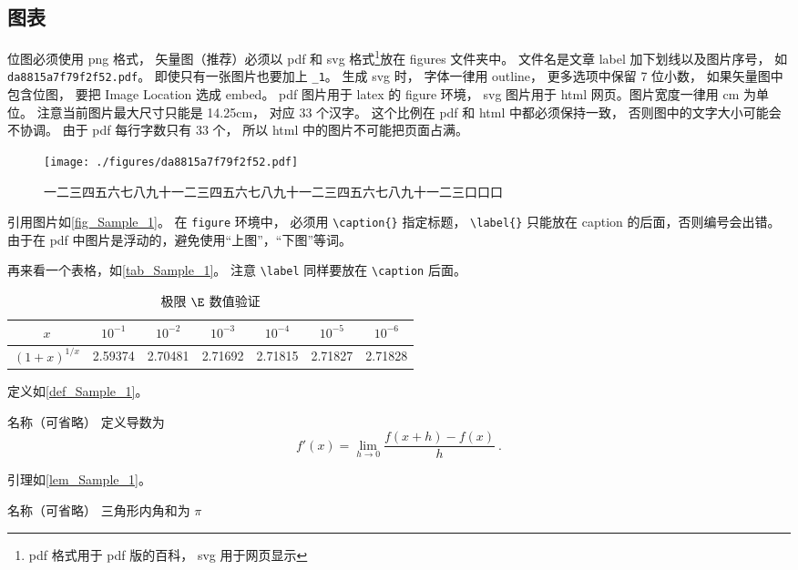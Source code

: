 \subsection{图表}

位图必须使用 png 格式， 矢量图（推荐）必须以 pdf 和 svg 格式\footnote{pdf 格式用于 pdf 版的百科， svg 用于网页显示}放在 figures 文件夹中。 文件名是文章 label 加下划线以及图片序号， 如 \verb|da8815a7f79f2f52.pdf|。 即使只有一张图片也要加上 \verb|_1|。 生成 svg 时， 字体一律用 outline， 更多选项中保留 7 位小数， 如果矢量图中包含位图， 要把 Image Location 选成 embed。 pdf 图片用于 latex 的 figure 环境， svg 图片用于 html 网页。图片宽度一律用 cm 为单位。 注意当前图片最大尺寸只能是 14.25cm， 对应 33 个汉字。 这个比例在 pdf 和 html 中都必须保持一致， 否则图中的文字大小可能会不协调。 由于 pdf 每行字数只有 33 个， 所以 html 中的图片不可能把页面占满。
\begin{figure}[ht]
\centering
\texttt{[image: ./figures/da8815a7f79f2f52.pdf]}
\caption{一二三四五六七八九十一二三四五六七八九十一二三四五六七八九十一二三口口口} \label{fig_Sample_1}
\end{figure}
引用图片如\autoref{fig_Sample_1}。 在 \verb|figure| 环境中， 必须用 \verb|\caption{}| 指定标题， \verb|\label{}| 只能放在 caption 的后面，否则编号会出错。由于在 pdf 中图片是浮动的，避免使用“上图”，“下图”等词。

再来看一个表格，如\autoref{tab_Sample_1}。 注意 \verb|\label| 同样要放在 \verb|\caption| 后面。
\begin{table}[ht]
\centering
\caption{极限 $\E$ 数值验证}\label{tab_Sample_1}
\begin{tabular}{|c|c|c|c|c|c|c|}
\hline
$x$ & ${10^{ - 1}}$ & ${10^{ - 2}}$ & ${10^{ - 3}}$ & ${10^{ - 4}}$ & ${10^{ - 5}}$ & ${10^{ - 6}}$ \\
\hline
$(1 + x)^{1/x}$ & 2.59374 & 2.70481 & 2.71692 & 2.71815 & 2.71827 & 2.71828 \\
\hline
\end{tabular}
\end{table}

定义如\autoref{def_Sample_1}。
\begin{definition}{名称（可省略）}\label{def_Sample_1}
定义导数为
\begin{equation}
f'(x) = \lim_{h \to 0} \frac{f(x + h) - f(x)}{h}~.
\end{equation}
\end{definition}

引理如\autoref{lem_Sample_1}。
\begin{lemma}{名称（可省略）}\label{lem_Sample_1}
三角形内角和为 $\pi$
\end{lemma}

